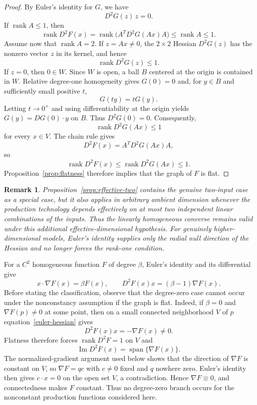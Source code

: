\documentclass[12pt]{amsart}
\newtheorem{remark}{Remark}[section]
\begin{document}
\begin{proof}
By Euler's identity for $G$, we have
\[
D^2G(z)\,z=0.
\]
If $\operatorname{rank}A\le1$, then
\[
 \operatorname{rank}D^2F(x)
 =\operatorname{rank}\bigl(A^TD^2G(Ax)A\bigr)
 \le \operatorname{rank}A\le1.
\]
Assume now that $\operatorname{rank}A=2$. If $z=Ax\ne0$, the $2\times2$ Hessian $D^2G(z)$ has the nonzero vector $z$ in its kernel, and hence
\[
 \operatorname{rank}D^2G(z)\le1.
\]
If $z=0$, then $0\in W$. Since $W$ is open, a ball $B$ centered at the origin is contained in $W$. Relative degree-one homogeneity gives $G(0)=0$ and, for $y\in B$ and sufficiently small positive $t$,
\[
 G(ty)=tG(y).
\]
Letting $t\to0^+$ and using differentiability at the origin yields $G(y)=DG(0)\cdot y$ on $B$. Thus $D^2G(0)=0$. Consequently,
\[
 \operatorname{rank}D^2G(Ax)\le1
\]
for every $x\in V$. The chain rule gives
\[
 D^2F(x)=A^TD^2G(Ax)A,
\]
so
\[
 \operatorname{rank}D^2F(x)\le \operatorname{rank}D^2G(Ax)\le1.
\]
Proposition~\ref{prop:flatness} therefore implies that the graph of $F$ is flat.
\end{proof}

\begin{remark}
Proposition~\ref{prop:effective-two} contains the genuine two-input case as a special case, but it also applies in arbitrary ambient dimension whenever the production technology depends effectively on at most two independent linear combinations of the inputs. Thus the linearly homogeneous converse remains valid under this additional effective-dimensional hypothesis. For genuinely higher-dimensional models, Euler's identity supplies only the radial null direction of the Hessian and no longer forces the rank-one condition.
\end{remark}

For a $C^2$ homogeneous function $F$ of degree $\beta$, Euler's identity and its differential give
\begin{equation}\label{euler-hessian}
 x\cdot\nabla F(x)=\beta F(x),\qquad
 D^2F(x)x=(\beta-1)\nabla F(x).
\end{equation}
Before stating the classification, observe that the degree-zero case cannot occur under the nonconstancy assumption if the graph is flat. Indeed, if $\beta=0$ and $\nabla F(p)\ne0$ at some point, then on a small connected neighborhood $V$ of $p$ equation~\eqref{euler-hessian} gives
\[
 D^2F(x)x=-\nabla F(x)\ne0.
\]
Flatness therefore forces $\operatorname{rank}D^2F=1$ on $V$ and
\[
 \operatorname{Im}D^2F(x)=\operatorname{span}\{\nabla F(x)\}.
\]
The normalized-gradient argument used below shows that the direction of $\nabla F$ is constant on $V$, so $\nabla F=q c$ with $c\ne0$ fixed and $q$ nowhere zero. Euler's identity then gives $c\cdot x=0$ on the open set $V$, a contradiction. Hence $\nabla F\equiv0$, and connectedness makes $F$ constant. Thus no degree-zero branch occurs for the nonconstant production functions considered here.
\end{document}
